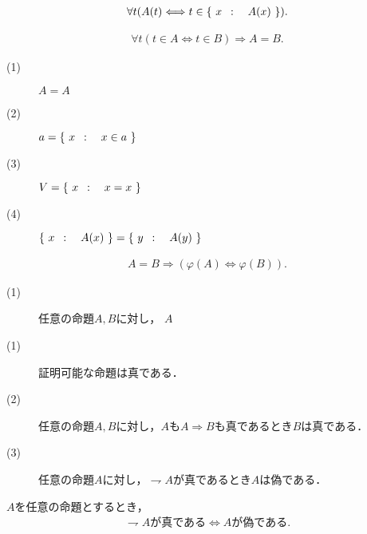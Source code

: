 	\begin{screen}
		\begin{axm}[類の公理]
			\begin{align}
				\forall t(A(t) \Longleftrightarrow t \in \left\{\ x\ \, : \quad A(x)\ \right\}).
			\end{align}
		\end{axm}
	\end{screen}
	
	\begin{screen}
		\begin{axm}[外延性の公理]
			\begin{align}
				\forall t(t \in A  \Longleftrightarrow t \in B)
				\Longrightarrow A=B.
			\end{align}
		\end{axm}
	\end{screen}
	
	\begin{screen}
		\begin{thm}
			\begin{description}
				\item[(1)] $A=A$
				\item[(2)] $a = \left\{\ x\ \, : \quad x \in a\ \right\}$
				\item[(3)] $V=\left\{\ x\ \, : \quad x=x\ \right\}$
				\item[(4)] $\left\{\ x\ \, : \quad A(x)\ \right\} = \left\{\ y\ \, : \quad A(y)\ \right\}$
			\end{description}
		\end{thm}
	\end{screen}
	
	\begin{screen}
		\begin{axm}[相当性の公理]
			\begin{align}
				A=B \Longrightarrow (\varphi(A) \Longleftrightarrow \varphi(B)).
			\end{align}
		\end{axm}
	\end{screen}
	
	\begin{screen}
		\begin{axm}[命題論理の公理]\mbox{}
			\begin{description}
				\item[(1)] 任意の命題$A,B$に対し，
					$A $
				\item[(1)] 証明可能な命題は真である．
				\item[(2)] 任意の命題$A,B$に対し，$A$も$A \Longrightarrow B$も真であるとき$B$は真である．
				\item[(3)] 任意の命題$A$に対し，$\rightharpoondown A$が真であるとき$A$は偽である．
			\end{description}
		\end{axm}
	\end{screen}
	
	\begin{screen}
		\begin{thm}
			$A$を任意の命題とするとき，
			\begin{align}
				\mbox{$\rightharpoondown A$が真である} \Longleftrightarrow \mbox{$A$が偽である}.
			\end{align}
		\end{thm}
	\end{screen}